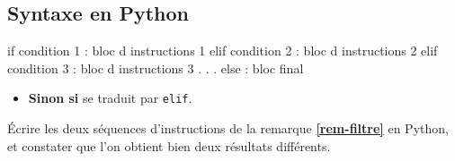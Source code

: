 \begin{rem}
\end{rem}

\subsection{Syntaxe en Python}

\begin{pyverbatim}
 if condition 1 :
	bloc d instructions 1
 elif condition 2 :
	bloc d instructions 2
 elif condition 3 :
	bloc d instructions 3
.
.
.
 else :
	bloc final
\end{pyverbatim}

\begin{itemize}
 \item \textbf{Sinon si} se traduit par \texttt{elif}. 
\end{itemize}

\begin{exemple}
Écrire les deux séquences d'instructions de la remarque \textbf{\ref{rem-filtre}} en Python, et 
constater que l'on obtient bien deux résultats différents.
\end{exemple}

